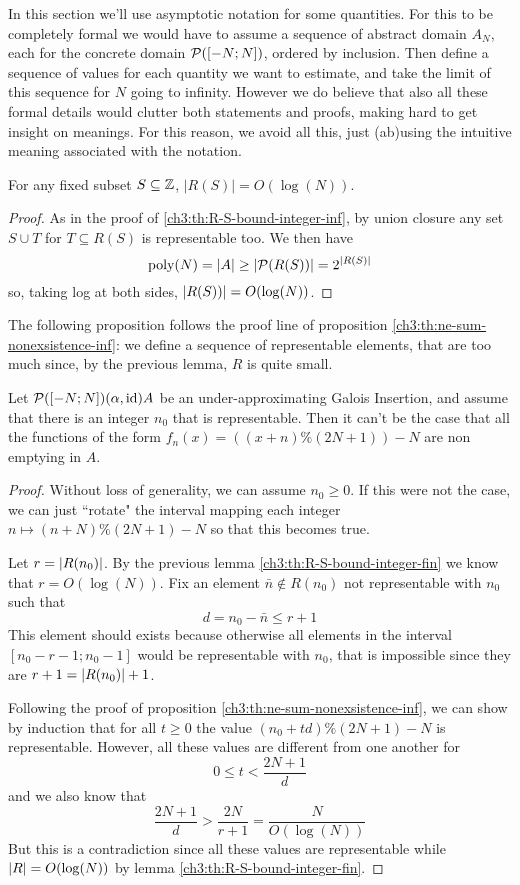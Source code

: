 In this section we'll use asymptotic notation for some quantities. For this to be completely formal we would have to assume a sequence of abstract domain $A_N$, each for the concrete domain $\mathcal{P}([-N; N])$, ordered by inclusion. Then define a sequence of values for each quantity we want to estimate, and take the limit of this sequence for $N$ going to infinity. However we do believe that also all these formal details would clutter both statements and proofs, making hard to get insight on meanings. For this reason, we avoid all this, just (ab)using the intuitive meaning associated with the notation.

\begin{lemma}\label{ch3:th:R-S-bound-integer-fin}
	For any fixed subset $S \subseteq \mathbb{Z}$, $\lvert R(S) \rvert = O(\log(N))$.
\end{lemma}
\begin{proof}
	As in the proof of \ref{ch3:th:R-S-bound-integer-inf}, by union closure any set $S \cup T$ for $T \subseteq R(S)$ is representable too. We then have
	\[
	\text{poly}(N) = \lvert A\rvert \ge \lvert\mathcal{P}(R(S))\rvert = 2^{\lvert R(S)\rvert} 
	\]
	so, taking log at both sides, $\lvert R(S))\rvert = O(\log(N))$.
\end{proof}

The following proposition follows the proof line of proposition \ref{ch3:th:ne-sum-nonexsistence-inf}: we define a sequence of representable elements, that are too much since, by the previous lemma, $R$ is quite small.

\begin{prop}\label{ch3:th:ne-sum-nonexsistence-fin}
	Let $\mathcal{P}([-N; N]) (\alpha, \text{id}) A$ be an under-approximating Galois Insertion, and assume that there is an integer $n_0$ that is representable. Then it can't be the case that all the functions of the form $f_n(x) = ((x + n) \% (2N + 1)) - N$ are non emptying in $A$.
\end{prop}
\begin{proof}
	Without loss of generality, we can assume $n_0 \ge 0$. If this were not the case, we can just ``rotate" the interval mapping each integer $n \mapsto (n + N) \% (2N + 1) - N$ so that this becomes true.

	Let $r = \lvert R(n_0)\rvert$. By the previous lemma \ref{ch3:th:R-S-bound-integer-fin} we know that $r = O(\log(N))$. Fix an element $\bar{n} \notin R(n_0)$ not representable with $n_0$ such that
	\[
	d = n_0 - \bar{n} \le r + 1
	\]
	This element should exists because otherwise all elements in the interval $[n_0 - r - 1; n_0 - 1]$ would be representable with $n_0$, that is impossible since they are $r + 1 = \lvert R(n_0)\rvert + 1$.

	Following the proof of proposition \ref{ch3:th:ne-sum-nonexsistence-inf}, we can show by induction that for all $t \ge 0$ the value $(n_0 + t d) \% (2N + 1) - N$ is representable. However, all these values are different from one another for
	\[
	0 \le t < \frac{2N + 1}{d}
	\]
	and we also know that
	\[
	\frac{2N + 1}{d} > \frac{2N}{r + 1} = \frac{N}{O(\log(N))}
	\]
	But this is a contradiction since all these values are representable while $\lvert R\rvert = O(\log(N))$ by lemma \ref{ch3:th:R-S-bound-integer-fin}.
\end{proof}

